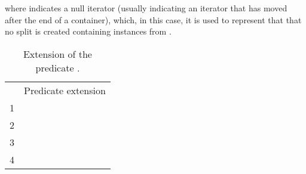 \documentclass[preprint]{tlp}
\begin{document}
\noindent where  indicates a null iterator 
(usually indicating an iterator that has moved after the end of a container), which, in this case, it is used to represent that  that no split is created containing instances from .

\begin{table}[t!]
 \begin{tabular}{|c|c|}
  \cline{1-2}
  & Predicate extension \\
  \cline{1-2}
    1 &  \\
    2 &  \\
  \cline{1-2}
    3 &  \\
    4 &  \\
  \cline{1-2}
 \end{tabular}
\caption{Extension of the predicate .}
\label{ext_2}
\end{table}






\clearpage{}  
\end{document}
